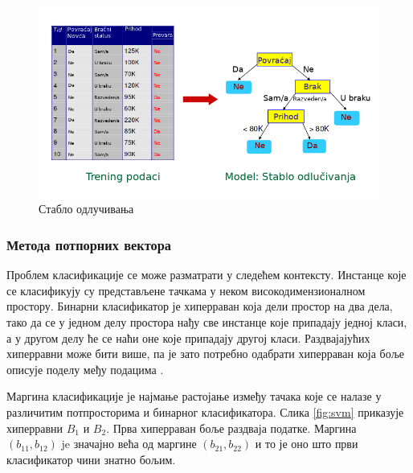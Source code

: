 \documentclass[a4paper]{article}
\begin{document}
{\begin{figure}[h!]
\begin{center}
\includegraphics[scale=0.4]{./slike/decision_tree.png}
\end{center}
\caption{Стабло одлучивања}
\label{fig:stablo}
\end{figure}


\subsubsection*{Метода потпорних вектора}
Проблем класификације се може разматрати у следећем контексту. Инстанце које се класификују су представљене тачкама у неком високодимензионалном простору. Бинарни класификатор је хиперраван која дели простор на два дела, тако да се у једном делу простора нађу све инстанце које припадају једној класи, а у другом делу ће се наћи оне које припадају другој класи. Раздвајајућих хиперравни може бити више, па је зато потребно одабрати хиперраван која боље описује поделу међу подацима \cite{svm-intro}.


Маргина класификације је најмање растојање између тачака које се налазе у различитим потпросторима и бинарног класификатора. Слика \ref{fig:svm} приказује хиперравни $B_1$ и $B_2$. Прва хиперраван боље раздваја податке. Маргина $(b_{11}, b_{12})$ je значајно већа од маргине $(b_{21}, b_{22})$ и то је оно што први класификатор чини знатно бољим.

}
\end{document}
